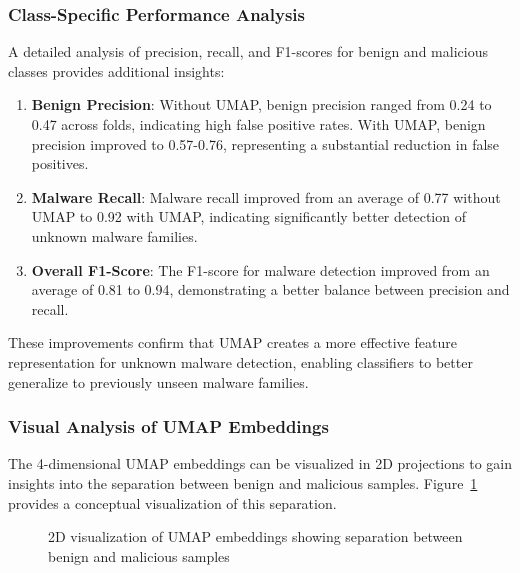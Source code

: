 \subsubsection{Class-Specific Performance Analysis}

A detailed analysis of precision, recall, and F1-scores for benign and malicious classes provides additional insights:

\begin{enumerate}
    \item \textbf{Benign Precision}: Without UMAP, benign precision ranged from 0.24 to 0.47 across folds, indicating high false positive rates. With UMAP, benign precision improved to 0.57-0.76, representing a substantial reduction in false positives.
    
    \item \textbf{Malware Recall}: Malware recall improved from an average of 0.77 without UMAP to 0.92 with UMAP, indicating significantly better detection of unknown malware families.
    
    \item \textbf{Overall F1-Score}: The F1-score for malware detection improved from an average of 0.81 to 0.94, demonstrating a better balance between precision and recall.
\end{enumerate}

These improvements confirm that UMAP creates a more effective feature representation for unknown malware detection, enabling classifiers to better generalize to previously unseen malware families.

\subsubsection{Visual Analysis of UMAP Embeddings}

The 4-dimensional UMAP embeddings can be visualized in 2D projections to gain insights into the separation between benign and malicious samples. Figure~\ref{fig:umap-visualization} provides a conceptual visualization of this separation.

\begin{figure}[!htbp]
\centering
\caption{2D visualization of UMAP embeddings showing separation between benign and malicious samples}
\label{fig:umap-visualization}
\end{figure}

